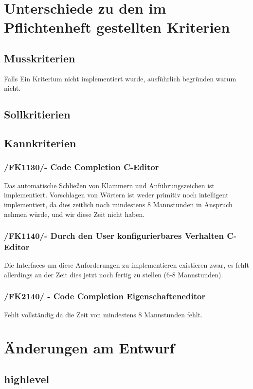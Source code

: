 \documentclass[a4paper]{scrreprt}
\begin{document}
\chapter{Unterschiede zu den im Pflichtenheft gestellten Kriterien}

\section{Musskriterien}
Falls Ein Kriterium nicht implementiert wurde, ausführlich begründen warum nicht.

\section{Sollkritierien}
\section{Kannkriterien}

\subsection{/FK1130/- Code Completion C-Editor}
Das automatische Schließen von Klammern und Anführungszeichen ist implementiert. Vorschlagen von Wörtern ist weder primitiv noch intelligent implementiert, da dies zeitlich noch mindestens 8 Mannstunden in Anspruch nehmen würde, und wir diese Zeit nicht haben.

\subsection{/FK1140/- Durch den User konfigurierbares Verhalten C-Editor}
Die Interfaces um diese Anforderungen zu implementieren existieren zwar, es fehlt allerdings an der Zeit dies jetzt noch fertig zu stellen (6-8 Mannstunden).

\subsection{/FK2140/ - Code Completion Eigenschafteneditor}
Fehlt vollständig da die Zeit von mindestens 8 Mannstunden fehlt.

\chapter{Änderungen am Entwurf}
\section{highlevel}
\end{document}
